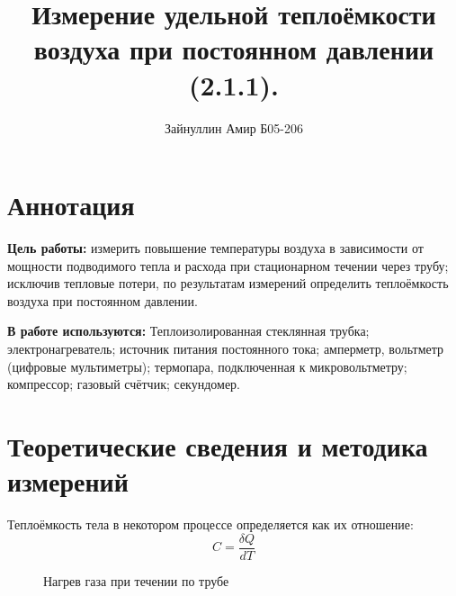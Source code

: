 \documentclass[a4paper,12pt]{article}
\title{\textbf{Измерение удельной теплоёмкости воздуха при постоянном давлении (2.1.1).}}
\author{Зайнуллин Амир Б05-206}
\begin{document}
\maketitle

\section{Аннотация}

\textbf{Цель работы:} 
измерить повышение температуры воздуха в зависимости от мощности
подводимого тепла и расхода при стационарном течении через трубу; исключив тепловые потери, по результатам измерений определить теплоёмкость воздуха при постоянном давлении.

\textbf{В работе используются:} 
Теплоизолированная стеклянная трубка; электронагреватель; источник питания постоянного тока; амперметр, вольтметр (цифровые мультиметры); термопара, подключенная к микровольтметру; компрессор; газовый счётчик;
секундомер.
	
\section{Теоретические сведения и методика измерений}

Теплоёмкость тела в некотором процессе определяется как их отношение: 
\begin{equation}
    C = \frac{\delta Q}{dT}
\end{equation}

\begin{figure}[H]
    \caption{Нагрев газа при течении по трубе}
\end{figure}
\end{document}
